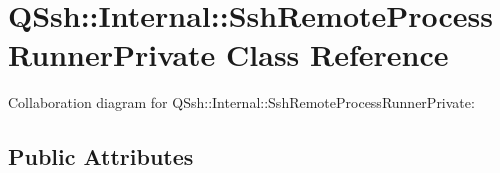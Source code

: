 \hypertarget{class_q_ssh_1_1_internal_1_1_ssh_remote_process_runner_private}{}\section{Q\+Ssh\+:\+:Internal\+:\+:Ssh\+Remote\+Process\+Runner\+Private Class Reference}
\label{class_q_ssh_1_1_internal_1_1_ssh_remote_process_runner_private}


Collaboration diagram for Q\+Ssh\+:\+:Internal\+:\+:Ssh\+Remote\+Process\+Runner\+Private\+:
\subsection*{Public Attributes}
